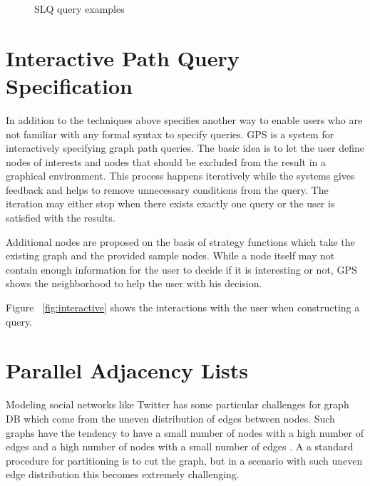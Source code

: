 \documentclass{sig-alternate}
\begin{document}
\begin{figure}[H]
\centering
{}
\caption{SLQ query examples \cite{yang2014schemaless}}
\label{fig:slqexample}
\end{figure}

\section{Interactive Path Query Specification}
In addition to the techniques above \cite{bonifati2015interactive} specifies another
way to enable users who are not familiar with any formal syntax to specify queries.
GPS is a system for interactively specifying graph path queries.
The basic idea is to let the user define nodes of interests and nodes that should be 
excluded from the result in a graphical environment. This process happens iteratively 
while the systems gives feedback and helps to remove unnecessary conditions from the query.
The iteration may either stop when there exists exactly one query or the user is satisfied with the 
results.

Additional nodes are proposed on the basis of strategy functions which take the existing graph and the provided sample nodes.
While a node itself may not contain enough information for the user to decide if it is interesting or not, GPS shows the 
neighborhood to help the user with his decision.

Figure ~\ref{fig:interactive} shows the interactions with the user when constructing a query.

\begin{figure*}
\centering
{}
\caption{Example of GPS interaction with user \cite{bonifati2015interactive}}
\label{fig:interactive}
\end{figure*}

\section{Parallel Adjacency Lists}
Modeling social networks like Twitter has some particular challenges
for graph DB which come from the uneven distribution of edges between nodes.
Such graphs have the tendency to have a small number of nodes with a high number of edges
and a high number of nodes with a small number of edges \cite{gonzalez2012powergraph}.
A a standard procedure for partitioning is to cut the graph, but in 
a scenario with such uneven edge distribution this becomes extremely challenging.
\end{document}
